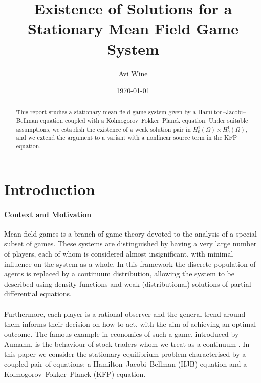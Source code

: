 \documentclass[11pt]{article}
\title{Existence of Solutions for a Stationary Mean Field Game System}
\author{Avi Wine}
\date{\today}
\numberwithin{equation}{section}
\theoremstyle{definition}
\theoremstyle{remark}
\begin{document}
\maketitle
\thispagestyle{empty}

\begin{abstract}
This report studies a stationary mean field game system given by a Hamilton--Jacobi--Bellman equation coupled with a Kolmogorov--Fokker--Planck equation. 
Under suitable assumptions, we establish the existence of a weak solution pair in $H_0^1(\Omega)\times H_0^1(\Omega)$, and we extend the argument to a variant with a nonlinear source term in the KFP equation.
\end{abstract}

\tableofcontents
\clearpage


\section{Introduction}

\paragraph{Context and Motivation}
Mean field games is a branch of game theory devoted to the analysis of a special subset of games. These systems are distinguished by having a very large number of players, each of whom is considered almost insignificant, with minimal influence on the system as a whole. 
In this framework the discrete population of agents is replaced by a continuum distribution, allowing the system to be described using density functions and weak (distributional) solutions of partial differential equations. \\ \\
Furthermore, each player is a rational observer and the general trend around them informs their decision on how to act, with the aim of achieving an optimal outcome.
The famous example in economics of such a game, introduced by Aumann, is the behaviour of stock traders whom we treat as a continuum \cite{aumann}.
In this paper we consider the stationary equilibrium problem characterised by a coupled pair of equations: a Hamilton--Jacobi--Bellman (HJB) equation and a Kolmogorov--Fokker--Planck (KFP) equation.
\end{document}
